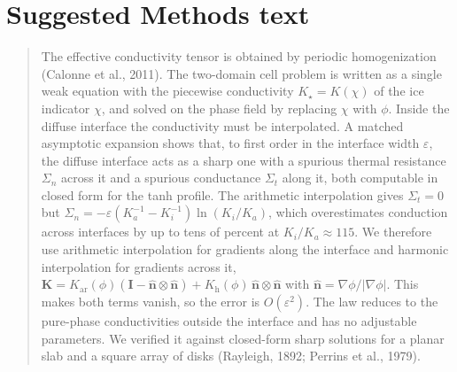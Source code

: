 \documentclass[11pt]{article}
\begin{document}
\section{Suggested Methods text}

\begin{quote}\small
The effective conductivity tensor is obtained by periodic homogenization
(Calonne et al., 2011). The two-domain cell problem is written as a single weak
equation with the piecewise conductivity $K_\star=K(\chi)$ of the ice indicator
$\chi$, and solved on the phase field by replacing $\chi$ with $\phi$. Inside
the diffuse interface the conductivity must be interpolated. A matched
asymptotic expansion shows that, to first order in the interface width
$\varepsilon$, the diffuse interface acts as a sharp one with a spurious thermal
resistance $\Sigma_n$ across it and a spurious conductance $\Sigma_t$ along it,
both computable in closed form for the tanh profile. The arithmetic
interpolation gives $\Sigma_t=0$ but
$\Sigma_n=-\varepsilon(K_a^{-1}-K_i^{-1})\ln(K_i/K_a)$, which overestimates
conduction across interfaces by up to tens of percent at $K_i/K_a\approx115$. We
therefore use arithmetic interpolation for gradients along the interface and
harmonic interpolation for gradients across it,
$\mathbf K=K_{\mathrm{ar}}(\phi)(\mathbf I-\hat{\mathbf n}\otimes\hat{\mathbf n})
+K_{\mathrm h}(\phi)\,\hat{\mathbf n}\otimes\hat{\mathbf n}$ with
$\hat{\mathbf n}=\nabla\phi/|\nabla\phi|$. This makes both terms vanish, so
the error is $O(\varepsilon^2)$. The law reduces to the pure-phase
conductivities outside the interface and has no adjustable parameters. We
verified it against closed-form sharp solutions for a planar slab and a square
array of disks (Rayleigh, 1892; Perrins et al., 1979).
\end{quote}
\end{document}
